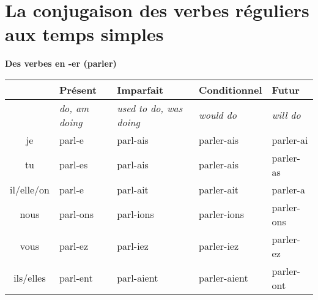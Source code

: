 

\section{La conjugaison des verbes r\'eguliers aux temps simples}
\setcounter{theorem}{0}
\setcounter{equation}{0}

\newcommand{\stemPresent}{parl}
\newcommand{\stemFutur}{parler}
\begin{center}
\textbf{Des verbes en -er (parler)}
\vskip 0.1cm
\begin{tabular}{|c||L{3cm}|L{3cm}|L{3cm}|L{3cm}|}
\hline
& Pr\'esent & Imparfait & Conditionnel & Futur \\
\hline
& \textit{do, am doing} & \textit{used to do, was doing} & \textit{would do} & \textit{will do} \\
\hline\hline
je            &	\stemPresent-e	&	\stemPresent-ais	&	\stemFutur-ais	 &	\stemFutur-ai	\\
tu            &	\stemPresent-es	&	\stemPresent-ais	&	\stemFutur-ais	&	\stemFutur-as	\\
il/elle/on  &	\stemPresent-e	&	\stemPresent-ait	&	\stemFutur-ait	&	\stemFutur-a	\\
nous       &	\stemPresent-ons	&	\stemPresent-ions	&	\stemFutur-ions	&	\stemFutur-ons	\\
vous       &	\stemPresent-ez	&	\stemPresent-iez	&	\stemFutur-iez		&	\stemFutur-ez	\\
ils/elles   &	\stemPresent-ent	&	\stemPresent-aient	&	\stemFutur-aient	&	\stemFutur-ont	\\
\hline
\end{tabular}
\end{center}

